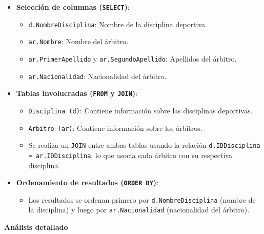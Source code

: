 \begin{itemize}
   \item \textbf{Selección de columnas (\texttt{SELECT})}:
   \begin{itemize}
       \item \texttt{d.NombreDisciplina}: Nombre de la disciplina deportiva.
       \item \texttt{ar.Nombre}: Nombre del árbitro.
       \item \texttt{ar.PrimerApellido} y \texttt{ar.SegundoApellido}: Apellidos del árbitro.
       \item \texttt{ar.Nacionalidad}: Nacionalidad del árbitro.
   \end{itemize}

   \item \textbf{Tablas involucradas (\texttt{FROM} y \texttt{JOIN})}:
   \begin{itemize}
       \item \texttt{Disciplina (d)}: Contiene información sobre las disciplinas deportivas.
       \item \texttt{Arbitro (ar)}: Contiene información sobre los árbitros.
       \item Se realiza un \texttt{JOIN} entre ambas tablas usando la relación \texttt{d.IDDisciplina = ar.IDDisciplina}, lo que asocia cada árbitro con su respectiva disciplina.
   \end{itemize}

   \item \textbf{Ordenamiento de resultados (\texttt{ORDER BY})}:
   \begin{itemize}
       \item Los resultados se ordenan primero por \texttt{d.NombreDisciplina} (nombre de la disciplina) y luego por \texttt{ar.Nacionalidad} (nacionalidad del árbitro).
   \end{itemize}
\end{itemize}

\textbf{Análisis detallado}

